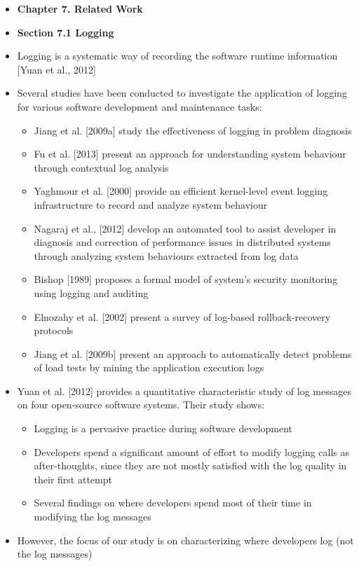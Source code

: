 \documentclass{article}
\newcommand{\bold}{\textbf}
\begin{document}
\begin{itemize} [leftmargin=.1in]
\item \bold{Chapter 7. Related Work}
\item \bold{Section 7.1 Logging}
\item Logging is a systematic way of recording the software runtime information [Yuan et al., 2012]
\item Several studies have been conducted to investigate the application of logging for various software development and maintenance tasks:
\begin{itemize}
\item Jiang et al. [2009a] study the effectiveness of logging in problem diagnosis
\item Fu et al. [2013] present an approach for understanding system behaviour through contextual log analysis
\item Yaghmour et al. [2000] provide an efficient kernel-level event logging infrastructure to record and analyze system behaviour
\item Nagaraj et al., [2012] develop an automated tool to assist developer in diagnosis and correction of performance issues in distributed systems through analyzing system behaviours extracted from log data
\item Bishop [1989] proposes a formal model of system’s security monitoring using logging and auditing
\item Elnozahy et al. [2002] present a survey of log-based rollback-recovery protocols
\item Jiang et al. [2009b] present an approach to automatically detect problems of load tests by mining the application execution logs
\end{itemize}
\item Yuan et al. [2012]  provides a quantitative characteristic study of log messages on four open-source software systems. Their study shows:
\begin{itemize}
\item Logging is a pervasive practice during software development
\item Developers spend a significant amount of effort to modify logging calls as after-thoughts, since they are not mostly satisfied with the log quality in their first attempt
\item Several findings on where developers spend most of their time in modifying the log messages
\end{itemize}
\item However, the focus of our study is on characterizing where developers log (not the log messages)


\end{itemize}
\end{document}

